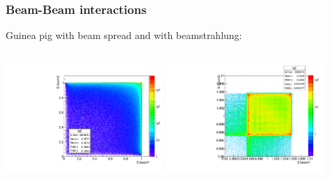 \documentclass{beamer}
\begin{document}
\begin{frame}
\frametitle{Beam-Beam interactions}
Guinea pig \alert{with} beam spread and \alert{with} beamstrahlung:\\
\begin{columns}[c]
\column{6cm}
\includegraphics[width=6cm]{E1_E2_spread_strahlung.pdf}
\column{6cm}
\includegraphics[width=6cm]{E1_E2_spread_strahlung_zoom.pdf}
\end{columns}
\end{frame}
\end{document}

